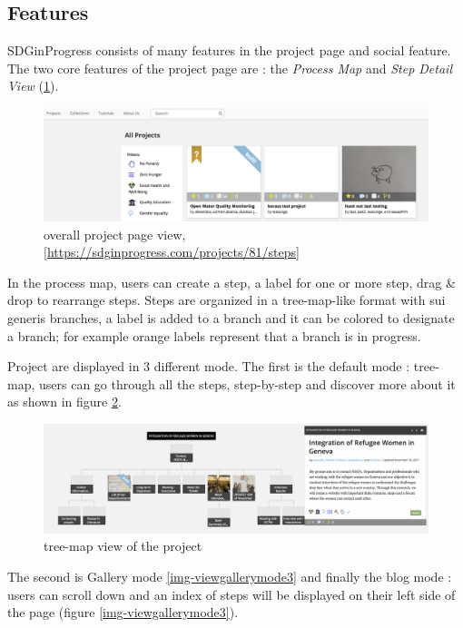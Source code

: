 \subsection{Features}\label{sec:feature}
SDGinProgress consists of many features in the project page and social feature. The two core features of the project page are : the \textit{Process Map} and \textit{Step Detail View } (\ref{img-sdginprogressproject}).
\begin{figure}[ht!]
	\centering
	\includegraphics[width=.5\textheight]{./images/img-sdginprogressproject.png}
	\caption{overall project page view, [\url{https://sdginprogress.com/projects/81/steps}]} 
	\label{img-sdginprogressproject}
\end{figure}
In the process map, users can create a step, a label for one or more step, drag \& drop  to rearrange steps. Steps are organized in a tree-map-like format with sui generis branches, a label is added to a branch and it can be colored to designate a branch; for example orange labels represent that a branch is in progress.

Project are displayed in 3 different mode.  The first is the default mode : tree-map, users can go through all the steps, step-by-step and discover more about it as shown in figure \ref{img-viewtreemode1}.
\begin{figure}[H]
	\centering
	\includegraphics[scale=.25]{./images/img-refugeeintegration.png}
	\caption{tree-map view of the project} 
	\label{img-viewtreemode1}
\end{figure}

The second is Gallery mode \ref{img-viewgallerymode3} and finally  the  blog mode : users can scroll down and an index of steps will be displayed on their left side of the page (figure \ref{img-viewgallerymode3}).

